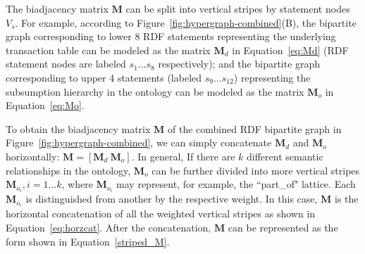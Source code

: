 The biadjacency matrix $\mathbf{M}$ can be split into vertical stripes by statement nodes $V_s$. For example, according to Figure~\ref{fig:hypergraph-combined}(B), the bipartite graph corresponding to lower 8 RDF statements representing the underlying transaction table can be modeled as the matrix $\mathbf{M}_d$ in Equation~\ref{eq:Md} (RDF statement nodes are labeled $s_1\dots s_8$ respectively); and the bipartite graph corresponding to upper 4 statements (labeled $s_9\dots s_{12}$) representing the subsumption hierarchy in the ontology can be modeled as the matrix $\mathbf{M}_o$ in Equation~\ref{eq:Mo}.

To obtain the biadjacency matrix $\mathbf{M}$ of the combined RDF bipartite graph in Figure~\ref{fig:hypergraph-combined}, we can simply concatenate $\mathbf{M}_d$ and $\mathbf{M}_o$ horizontally: $\mathbf{M}=\left[\mathbf{M}_d~\mathbf{M}_o\right]$. In general, If there are $k$ different semantic relationships in the ontology, $\mathbf{M}_o$ can be further divided into more vertical stripes $\mathbf{M}_{o_i}, i=1\dots k$, where $\mathbf{M}_{o_i}$ may represent, for example, the ``part\_of" lattice. Each $\mathbf{M}_{o_i}$ is  distinguished from another by the respective weight. In this case, $\mathbf{M}$ is the horizontal concatenation of all the weighted vertical stripes as shown in Equation~\ref{eq:horzcat}. After the concatenation, $\mathbf{M}$ can be represented as the form shown in Equation~\ref{striped_M}.

